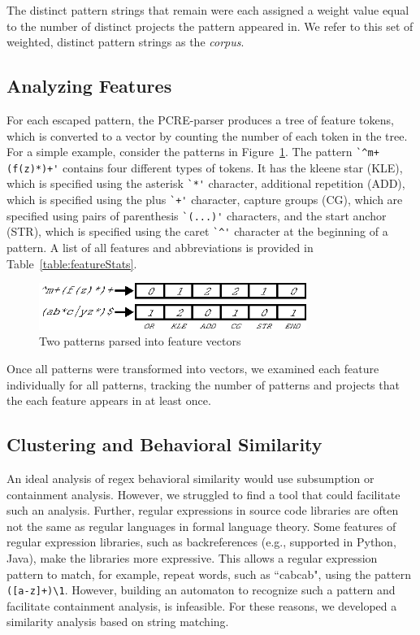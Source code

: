 The  distinct pattern strings that remain were each assigned a weight value equal to the number of distinct projects the pattern appeared in.  We  refer to this set of weighted, distinct pattern strings as the \emph{corpus}.

\subsection{Analyzing Features}
\label{study:features}
For each escaped pattern, the PCRE-parser produces a tree of feature tokens, which is converted to a vector by counting the number of each token  in the tree.  For a simple example, consider the patterns in Figure~\ref{fig:featureParsing}.  The pattern \verb!`^m+(f(z)*)+'! contains four different types of tokens. It has the kleene star (KLE), which is specified using the asterisk \verb!`*'! character, additional repetition (ADD), which is specified using the plus \verb!`+'! character, capture groups (CG), which are specified using pairs of parenthesis \verb!`(...)'! characters, and the start anchor (STR), which is specified using the caret \verb!`^'! character at the beginning of a pattern. A list of all features and abbreviations is provided in Table~\ref{table:featureStats}.

\begin{figure}[tb]
\centering
\includegraphics[height=0.6in]{nontex/featureParsing.eps}
\caption{Two patterns parsed into feature vectors}
\label{fig:featureParsing}
\end{figure}

Once all patterns were transformed into vectors, we examined each feature individually for all patterns, tracking the number of patterns and  projects that the each feature appears in at least once.

\newpage
\subsection{Clustering and Behavioral Similarity}
An ideal analysis of regex behavioral similarity would use subsumption or containment analysis. However, we struggled to find a tool that could facilitate such an analysis. Further, regular expressions in source code libraries  are often not the same as regular languages in formal language theory. Some features of regular expression libraries, such as backreferences (e.g., supported in Python, Java), make the libraries more expressive. This allows a regular expression pattern to match, for example, repeat words, such as ``cabcab", using the pattern {\tt ([a-z]+)\verb!\!1}. However, building an automaton to recognize such a pattern and  facilitate containment analysis, is infeasible.
For these reasons, we developed a similarity analysis based on string matching.

